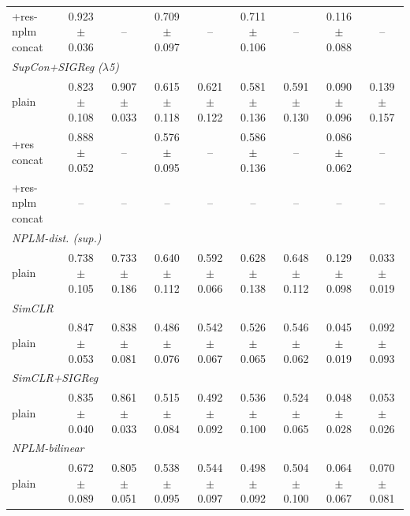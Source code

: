\begin{landscape}
\begin{center}
\begin{longtable}{lcccccccc}
\quad +res-nplm concat & 0.923$\pm$0.036 & -- & 0.709$\pm$0.097 & -- & 0.711$\pm$0.106 & -- & 0.116$\pm$0.088 & -- \\
\multicolumn{9}{l}{\emph{SupCon+SIGReg ($\lambda$5)}} \\
\quad plain & 0.823$\pm$0.108 & 0.907$\pm$0.033 & 0.615$\pm$0.118 & 0.621$\pm$0.122 & 0.581$\pm$0.136 & 0.591$\pm$0.130 & 0.090$\pm$0.096 & 0.139$\pm$0.157 \\
\quad +res concat & 0.888$\pm$0.052 & -- & 0.576$\pm$0.095 & -- & 0.586$\pm$0.136 & -- & 0.086$\pm$0.062 & -- \\
\quad +res-nplm concat & -- & -- & -- & -- & -- & -- & -- & -- \\
\multicolumn{9}{l}{\emph{NPLM-dist. (sup.)}} \\
\quad plain & 0.738$\pm$0.105 & 0.733$\pm$0.186 & 0.640$\pm$0.112 & 0.592$\pm$0.066 & 0.628$\pm$0.138 & 0.648$\pm$0.112 & 0.129$\pm$0.098 & 0.033$\pm$0.019 \\
\multicolumn{9}{l}{\emph{SimCLR}} \\
\quad plain & 0.847$\pm$0.053 & 0.838$\pm$0.081 & 0.486$\pm$0.076 & 0.542$\pm$0.067 & 0.526$\pm$0.065 & 0.546$\pm$0.062 & 0.045$\pm$0.019 & 0.092$\pm$0.093 \\
\multicolumn{9}{l}{\emph{SimCLR+SIGReg}} \\
\quad plain & 0.835$\pm$0.040 & 0.861$\pm$0.033 & 0.515$\pm$0.084 & 0.492$\pm$0.092 & 0.536$\pm$0.100 & 0.524$\pm$0.065 & 0.048$\pm$0.028 & 0.053$\pm$0.026 \\
\multicolumn{9}{l}{\emph{NPLM-bilinear}} \\
\quad plain & 0.672$\pm$0.089 & 0.805$\pm$0.051 & 0.538$\pm$0.095 & 0.544$\pm$0.097 & 0.498$\pm$0.092 & 0.504$\pm$0.100 & 0.064$\pm$0.067 & 0.070$\pm$0.081 \\
\end{longtable}
\end{center}
\end{landscape}
